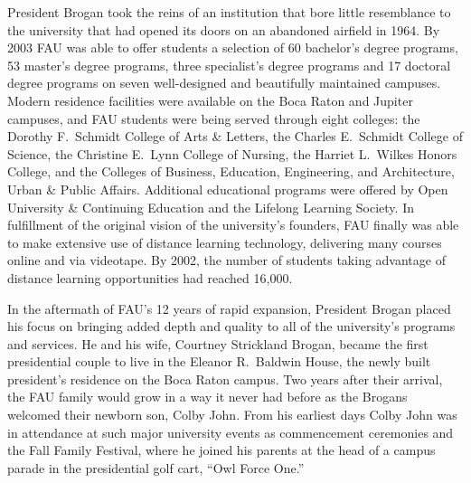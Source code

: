 \documentclass[phd, 12pt, print]{fauthesis}
\begin{document}
President Brogan took the reins of an institution that bore little resemblance to the university that had opened its doors on an abandoned airfield in 1964.  By 2003 FAU was able to offer students a selection of 60 bachelor's degree programs, 53 master's degree programs, three specialist's degree programs and 17 doctoral degree programs on seven well-designed and beautifully maintained campuses.  Modern residence facilities were available on the Boca Raton and Jupiter campuses, and FAU students were being served through eight colleges: the Dorothy F.\ Schmidt College of Arts \& Letters, the Charles E.\ Schmidt College of Science, the Christine E.\ Lynn College of Nursing, the Harriet L.\ Wilkes Honors College, and the Colleges of Business, Education, Engineering, and Architecture, Urban \& Public Affairs.  Additional educational programs were offered by Open University \& Continuing Education and the Lifelong Learning Society.  In fulfillment of the original vision of the university's founders, FAU finally was able to make extensive use of distance learning technology, delivering many courses online and via videotape.  By 2002, the number of students taking advantage of distance learning opportunities had reached 16,000.

In the aftermath of FAU's 12 years of rapid expansion, President Brogan placed his focus on bringing added depth and quality to all of the university's programs and services.  He and his wife, Courtney Strickland Brogan, became the first presidential couple to live in the Eleanor R.\ Baldwin House, the newly built president's residence on the Boca Raton campus.  Two years after their arrival, the FAU family would grow in a way it never had before as the Brogans welcomed their newborn son, Colby John.  From his earliest days Colby John was in attendance at such major university events as commencement ceremonies and the Fall Family Festival, where he joined his parents at the head of a campus parade in the presidential golf cart, ``Owl Force One.''
\end{document}
